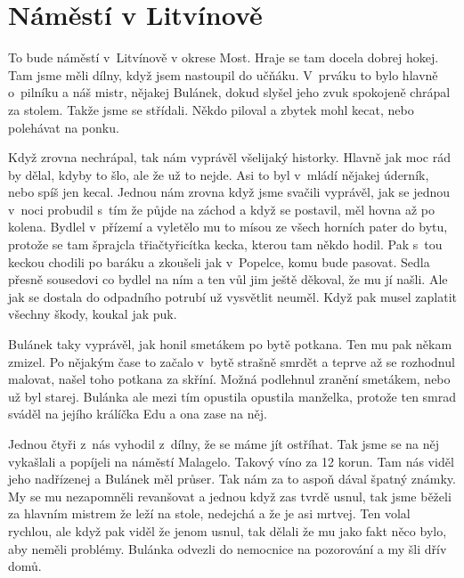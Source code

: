 
\chapter{Náměstí v Litvínově}

To bude náměstí v~Litvínově v okrese Most. Hraje se tam docela dobrej hokej.
Tam jsme měli dílny, když jsem nastoupil do učňáku. V~prváku to bylo hlavně
o~pilníku a náš mistr, nějakej Bulánek, dokud slyšel jeho zvuk spokojeně
chrápal za stolem. Takže jsme se střídali. Někdo piloval a zbytek mohl kecat,
nebo polehávat na ponku.

Když zrovna nechrápal, tak nám vyprávěl všelijaký historky. Hlavně jak moc rád
by dělal, kdyby to šlo, ale že už to nejde. Asi to byl v~mládí nějakej úderník,
nebo spíš jen kecal. Jednou nám zrovna když jsme svačili vyprávěl, jak se
jednou v~noci probudil s~tím že půjde na záchod a když se postavil, měl hovna
až po kolena. Bydlel v~přízemí a vyletělo mu to mísou ze všech horních pater do
bytu, protože se tam šprajcla třiačtyřicítka kecka, kterou tam někdo hodil. Pak
s~tou keckou chodili po baráku a zkoušeli jak v~Popelce, komu bude pasovat.
Sedla přesně sousedovi co bydlel na ním a ten vůl jim ještě děkoval, že mu jí
našli. Ale jak se dostala do odpadního potrubí už vysvětlit neuměl. Když pak
musel zaplatit všechny škody, koukal jak puk.

Bulánek taky vyprávěl, jak honil smetákem po bytě potkana. Ten mu pak někam
zmizel. Po nějakým čase to začalo v~bytě strašně smrdět a teprve až se
rozhodnul malovat, našel toho potkana za skříní. Možná podlehnul zranění
smetákem, nebo už byl starej. Bulánka ale mezi tím opustila opustila manželka,
protože ten smrad sváděl na jejího králíčka Edu a ona zase na něj.

Jednou čtyři z~nás vyhodil z~dílny, že se máme jít ostříhat. Tak jsme se na něj
vykašlali a popíjeli na náměstí Malagelo. Takový víno za 12 korun. Tam nás
viděl jeho nadřízenej a Bulánek měl průser. Tak nám za to aspoň dával špatný
známky. My se mu nezapomněli revanšovat a jednou když zas tvrdě usnul, tak jsme
běželi za hlavním mistrem že leží na stole, nedejchá a že je asi mrtvej. Ten
volal rychlou, ale když pak viděl že jenom usnul, tak dělali že mu jako fakt
něco bylo, aby neměli problémy. Bulánka odvezli do nemocnice na pozorování a my
šli dřív domů.

